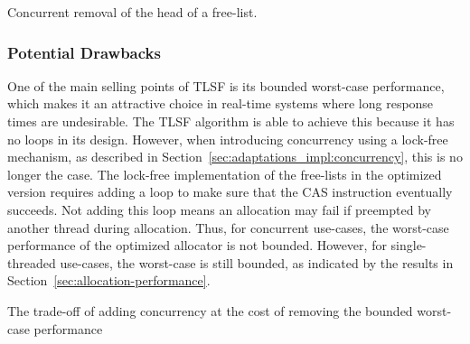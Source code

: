 \begin{algorithm}[H]
    \SetAlgoLined


\label{algorithm:concurrent_remove_block}
\caption{Concurrent removal of the head of a free-list.}
\end{algorithm}

\subsubsection{Potential Drawbacks}

One of the main selling points of TLSF is its bounded worst-case performance, which makes it an attractive choice in real-time systems where long response times are undesirable. The TLSF algorithm is able to achieve this because it has no loops in its design. However, when introducing concurrency using a lock-free mechanism, as described in Section~\ref{sec:adaptations_impl:concurrency}, this is no longer the case. The lock-free implementation of the free-lists in the optimized version requires adding a loop to make sure that the CAS instruction eventually succeeds. Not adding this loop means an allocation may fail if preempted by another thread during allocation. Thus, for concurrent use-cases, the worst-case performance of the optimized allocator is not bounded. However, for single-threaded use-cases, the worst-case is still bounded, as indicated by the results in Section~\ref{sec:allocation-performance}.

The trade-off of adding concurrency at the cost of removing the bounded worst-case performance 

